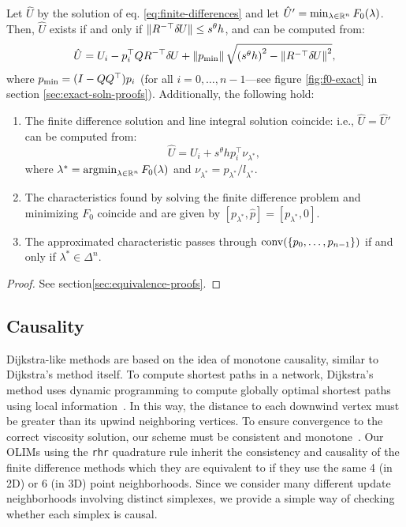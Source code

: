 \documentclass[smallcondensed]{svjour3}
\begin{document}
\begin{theorem}\label{thm:equivalence}
  Let $\hat{U}$ by the solution of eq.\@
  \ref{eq:finite-differences} and let
  $\hat{U}' = \min_{\lambda \in \mathbb{R}^n} F_0(\lambda)$. Then, $\hat{U}$
  exists if and only if $\|R^{-\top} {\delta \hspace{-0.09em} U}\| \leq s^\theta h$, and can
  be computed from:
  \begin{equation}
    \label{eq:U-finite-diff}
    \hat{U} = U_i - p_i^\top Q R^{-\top} {\delta \hspace{-0.09em} U} + \left\|p_{\operatorname{min}}\right\| \sqrt{{(s^\theta h)}^2 - \left\|R^{-\top} {\delta \hspace{-0.09em} U}\right\|^2},
  \end{equation}
  where $p_{\operatorname{min}} = (I - QQ^\top) p_i$ (for all
  $i = 0, \hdots, n - 1$---see figure \ref{fig:f0-exact} in section\@
  \ref{sec:exact-soln-proofs}). Additionally, the following hold:
  \begin{enumerate}
  \item The finite difference solution and line integral solution
    coincide: i.e., $\hat{U} = \hat{U}'$ can be computed from:
    \begin{equation}
      \label{eq:U-from-Ui-exact}
      \hat{U} = U_i + s^\theta h p_i^\top \nu_{\lambda^*},
    \end{equation}
    where $\lambda^* = \operatorname{argmin}_{\lambda \in \mathbb{R}^n} F_0(\lambda)$ and
    $\nu_{\lambda^*} = p_{\lambda^*}/l_{\lambda^*}$.
  \item The characteristics found by solving the finite difference
    problem and minimizing $F_0$ coincide and are given by
    $[p_{\lambda^*}, \hat{p}] = [p_{\lambda^*}, 0]$.
  \item The approximated characteristic passes through
    $\operatorname{conv}(\left\{p_0, \hdots, p_{n-1}\right\})$ if and only if
    $\lambda^* \in \Delta^n$.
  \end{enumerate}
\end{theorem}

\begin{proof}
  See section\@ \ref{sec:equivalence-proofs}.
\end{proof}

\subsection{Causality}\label{ssec:causality} Dijkstra-like
methods are based on the idea of monotone causality, similar to
Dijkstra's method itself. To compute shortest paths in a network,
Dijkstra's method uses dynamic programming to compute globally optimal
shortest paths using local information~\cite{dijkstra1959note}. In
this way, the distance to each downwind vertex must be greater than
its upwind neighboring vertices. To ensure convergence to the correct
viscosity solution, our scheme must be consistent and
monotone~\cite{crandall1983viscosity}. Our OLIMs using the
\texttt{rhr} quadrature rule inherit the consistency and causality of
the finite difference methods which they are equivalent to if they use
the same 4 (in 2D) or 6 (in 3D) point neighborhoods. Since we consider
many different update neighborhoods involving distinct simplexes, we
provide a simple way of checking whether each simplex is causal.
\end{document}

